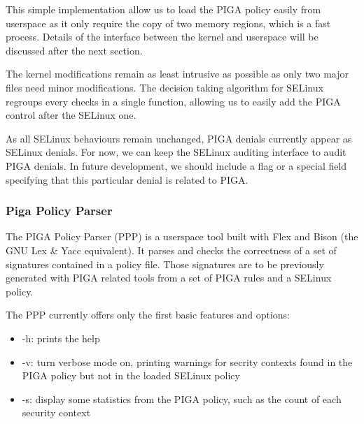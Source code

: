 \documentclass[pdftex,a4paper,titlepage,11pt]{article}
\begin{document}
\smallskip

This simple implementation allow us to load the PIGA policy easily from
userspace as it only require the copy of two memory regions, which is a fast
process. Details of the interface between the kernel and userspace will be
discussed after the next section.

\bigskip

The kernel modifications remain as least intrusive as possible as only two major
files need minor modifications. The decision taking algorithm for SELinux
regroups every checks in a single function, allowing us to easily add the PIGA
control after the SELinux one.

\bigskip

As all SELinux behaviours remain unchanged, PIGA denials currently appear as
SELinux denials. For now, we can keep the SELinux auditing interface to audit
PIGA denials. In future development, we should include a flag or a special field
specifying that this particular denial is related to PIGA.

\subsubsection{Piga Policy Parser}

The PIGA Policy Parser (PPP) is a userspace tool built with Flex and Bison (the
GNU Lex \& Yacc equivalent). It parses and checks the correctness of a set of
signatures contained in a policy file. Those signatures are to be previously
generated with PIGA related tools from a set of PIGA rules and a SELinux policy.

The PPP currently offers only the first basic features and options:
\begin{itemize}
	\item -h: prints the help
	\item -v: turn verbose mode on, printing warnings for secrity contexts found
in the PIGA policy but not in the loaded SELinux policy
	\item -s: display some statistics from the PIGA policy, such as the count of
each security context
\end{itemize}

\smallskip
\end{document}
